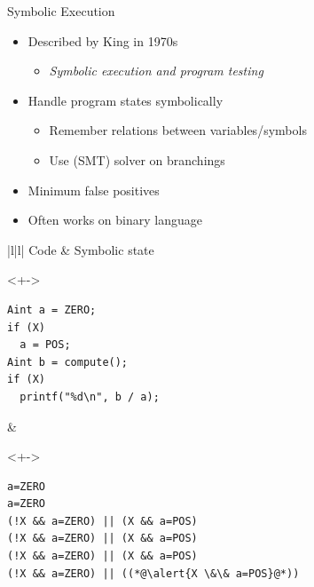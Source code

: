 \begin{frame}[fragile]{Symbolic Execution}

  \begin{itemize}
    \item Described by King in 1970s
    \begin{itemize}
      \item \textit{Symbolic execution and program testing}
    \end{itemize}

    \item Handle program states symbolically
    \begin{itemize}
      \item Remember relations between variables/symbols
      \item Use (SMT) solver on branchings
    \end{itemize}

    \pause

    \item Minimum false positives

    \pause

    \item Often works on binary language

  \end{itemize}

  \pause

  \begin{center}
  \begin{tabular}{|l|l|} \hline
  Code & Symbolic state \\ \hline
  \begin{uncoverenv}<+->
  \begin{lstlisting}
Aint a = ZERO;
if (X)
  a = POS;
Aint b = compute();
if (X)
  printf("%d\n", b / a);
  \end{lstlisting} %
  \end{uncoverenv}
  &
  \begin{uncoverenv}<+->
  \begin{lstlisting}
a=ZERO
a=ZERO
(!X && a=ZERO) || (X && a=POS)
(!X && a=ZERO) || (X && a=POS)
(!X && a=ZERO) || (X && a=POS)
(!X && a=ZERO) || ((*@\alert{X \&\& a=POS}@*))
  \end{lstlisting}
  \end{uncoverenv}
  \\ \hline
  \end{tabular}
  \end{center}

\end{frame}


